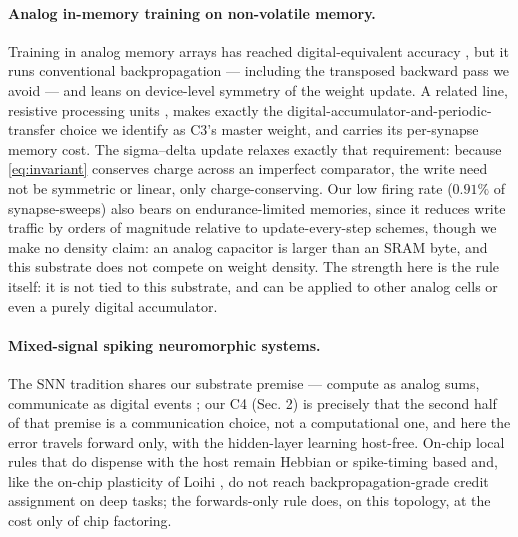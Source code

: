 \documentclass[11pt]{article}
\begin{document}
\hypertarget{analog-in-memory-training-on-non-volatile-memory.}{%
\paragraph{Analog in-memory training on non-volatile
memory.}\label{analog-in-memory-training-on-non-volatile-memory.}}

Training in analog memory arrays has reached digital-equivalent accuracy
\cite{ambrogio2018equivalent}, but it runs conventional backpropagation
--- including the transposed backward pass we avoid --- and leans on
device-level symmetry of the weight update. A related line, resistive
processing units \cite{gokmen2016acceleration}, makes exactly the
digital-accumulator-and-periodic-transfer choice we identify as C3's
master weight, and carries its per-synapse memory cost. The sigma--delta
update relaxes exactly that requirement: because \eqref{eq:invariant} conserves charge
across an imperfect comparator, the write need not be symmetric or
linear, only charge-conserving. Our low firing rate (\(0.91\%\) of
synapse-sweeps) also bears on endurance-limited memories, since it
reduces write traffic by orders of magnitude relative to
update-every-step schemes, though we make no density claim: an analog
capacitor is larger than an SRAM byte, and this substrate does not
compete on weight density. The strength here is the rule itself: it is
not tied to this substrate, and can be applied to other analog cells or
even a purely digital accumulator.

\hypertarget{mixed-signal-spiking-neuromorphic-systems.}{%
\paragraph{Mixed-signal spiking neuromorphic
systems.}\label{mixed-signal-spiking-neuromorphic-systems.}}

The SNN tradition shares our substrate premise --- compute as analog
sums, communicate as digital events
\cite{cramer2022surrogate, chicca2014neuromorphic, benjamin2014neurogrid, moradi2018dynap};
our C4 (Sec. 2) is precisely that the second half of that premise is a
communication choice, not a computational one, and here the error
travels forward only, with the hidden-layer learning host-free. On-chip
local rules that do dispense with the host
\cite{rubino2023neuromorphic} remain Hebbian or spike-timing based and,
like the on-chip plasticity of Loihi \cite{davies2018loihi}, do not
reach backpropagation-grade credit assignment on deep tasks; the
forwards-only rule does, on this topology, at the cost only of chip
factoring.
\end{document}
